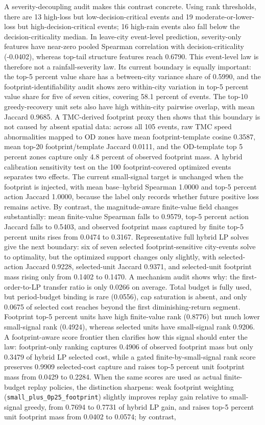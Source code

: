 A severity-decoupling audit makes this contrast concrete. Using rank thresholds, there are 13 high-loss but low-decision-critical events and 19 moderate-or-lower-loss but high-decision-critical events; 16 high-rain events also fall below the decision-criticality median. In leave-city event-level prediction, severity-only features have near-zero pooled Spearman correlation with decision-criticality (-0.0402), whereas top-tail structure features reach 0.6790. This event-level law is therefore not a rainfall-severity law. Its current boundary is equally important: the top-5 percent value share has a between-city variance share of 0.5990, and the footprint-identifiability audit shows zero within-city variation in top-5 percent value share for five of seven cities, covering 58.1 percent of events. The top-10 greedy-recovery unit sets also have high within-city pairwise overlap, with mean Jaccard 0.9685. A TMC-derived footprint proxy then shows that this boundary is not caused by absent spatial data: across all 105 events, raw TMC speed abnormalities mapped to OD zones have mean footprint-template cosine 0.3587, mean top-20 footprint/template Jaccard 0.0111, and the OD-template top 5 percent zones capture only 4.8 percent of observed footprint mass. A hybrid calibration sensitivity test on the 100 footprint-covered optimized events separates two effects. The current small-signal target is unchanged when the footprint is injected, with mean base--hybrid Spearman 1.0000 and top-5 percent action Jaccard 1.0000, because the label only records whether future positive loss remains active. By contrast, the magnitude-aware finite-value field changes substantially: mean finite-value Spearman falls to 0.9579, top-5 percent action Jaccard falls to 0.5403, and observed footprint mass captured by finite top-5 percent units rises from 0.0474 to 0.3167. Representative full hybrid LP solves give the next boundary: six of seven selected footprint-sensitive city-events solve to optimality, but the optimized support changes only slightly, with selected-action Jaccard 0.9228, selected-unit Jaccard 0.9371, and selected-unit footprint mass rising only from 0.1402 to 0.1470. A mechanism audit shows why: the first-order-to-LP transfer ratio is only 0.0266 on average. Total budget is fully used, but period-budget binding is rare (0.0556), cap saturation is absent, and only 0.0675 of selected cost reaches beyond the first diminishing-return segment. Footprint top-5 percent units have high finite-value rank (0.8776) but much lower small-signal rank (0.4924), whereas selected units have small-signal rank 0.9206. A footprint-aware score frontier then clarifies how this signal should enter the law: footprint-only ranking captures 0.4906 of observed footprint mass but only 0.3479 of hybrid LP selected cost, while a gated finite-by-small-signal rank score preserves 0.9909 selected-cost capture and raises top-5 percent unit footprint mass from 0.0429 to 0.2284. When the same scores are used as actual finite-budget replay policies, the distinction sharpens: weak footprint weighting (\texttt{small\_plus\_0p25\_footprint}) slightly improves replay gain relative to small-signal greedy, from 0.7694 to 0.7731 of hybrid LP gain, and raises top-5 percent unit footprint mass from 0.0402 to 0.0574; by contrast, 